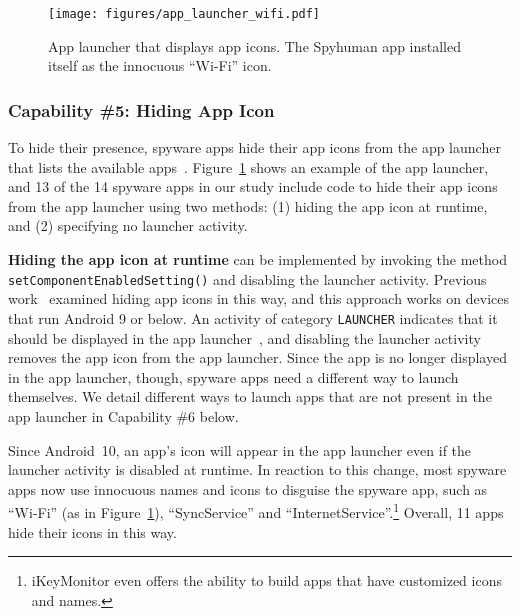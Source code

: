 \documentclass[sigconf,balance=false]{acmart}
\newcommand{\alex}[1]{\textcolor{chicagomaroon}{\noindent[AL: #1]}}
\newcommand{\damon}[1]{\textcolor{blue}{\noindent[DM: #1]}}
\newcommand{\alex}[1]{}
\newcommand{\damon}[1]{}
\begin{document}
\begin{figure}[t]
\centering
\texttt{[image: figures/app\_launcher\_wifi.pdf]}
\caption{App launcher that displays app icons.
The Spyhuman app installed itself as the innocuous ``Wi-Fi'' icon.}
\label{fig:app_launcher}
\end{figure}

\subsubsection*{Capability \#5: Hiding App Icon}
\label{subsubsec:hide_icon}
To hide their presence,
spyware apps hide their app icons from the app launcher that lists the available
apps~\cite{whataret1:online}. Figure~\ref{fig:app_launcher} shows an example of
the app launcher, and 13 of the 14 spyware apps in our study include code to hide their
app icons from the app launcher using two methods:
(1) hiding the app icon at runtime, and (2) specifying no launcher activity.

\textbf{Hiding the app icon at runtime} can be implemented by invoking
the method \texttt{setComponentEnabledSetting()} and disabling the
launcher activity.  Previous work~\cite{shan2018self} examined hiding
app icons in this way, and this approach works on devices that run
Android 9 or below. An activity of category \texttt{LAUNCHER}
indicates that it should be displayed in the app
launcher~\cite{IntentAn33:online}, and disabling the launcher activity
removes the app icon from the app launcher.  Since the app is no
longer displayed in the app launcher, though, spyware apps need a
different way to launch themselves. We detail different ways to launch
apps that are not present in the app launcher in Capability \#6 below.

Since Android~10, an app's icon will appear in the app launcher even
if the launcher activity is disabled at runtime. In reaction to this
change, most spyware apps now use innocuous names and icons to
disguise the spyware app, such as ``Wi-Fi'' (as in Figure~\ref{fig:app_launcher}), ``SyncService'' and
``InternetService''.\footnote{iKeyMonitor even offers the ability to
  build apps that have customized icons and names.} Overall, 11 apps hide their icons in this way.
\end{document}

